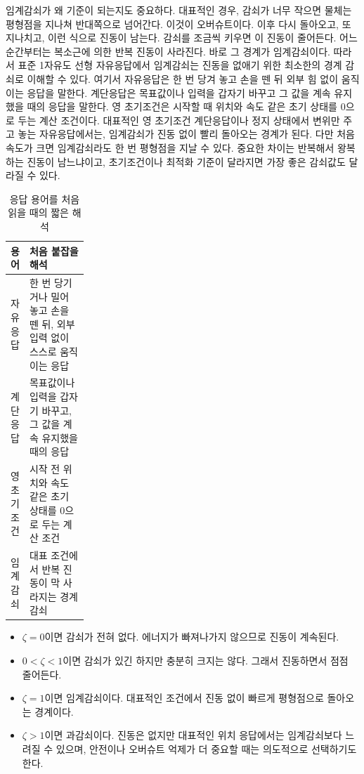 임계감쇠가 왜 기준이 되는지도 중요하다.
대표적인 경우, 감쇠가 너무 작으면 물체는 평형점을 지나쳐 반대쪽으로 넘어간다.
이것이 오버슈트이다.
이후 다시 돌아오고, 또 지나치고, 이런 식으로 진동이 남는다.
감쇠를 조금씩 키우면 이 진동이 줄어든다.
어느 순간부터는 복소근에 의한 반복 진동이 사라진다.
바로 그 경계가 임계감쇠이다.
따라서 표준 1자유도 선형 자유응답에서 임계감쇠는 진동을 없애기 위한 최소한의 경계 감쇠로 이해할 수 있다.
여기서 자유응답은 한 번 당겨 놓고 손을 뗀 뒤 외부 힘 없이 움직이는 응답을 말한다.
계단응답은 목표값이나 입력을 갑자기 바꾸고 그 값을 계속 유지했을 때의 응답을 말한다.
영 초기조건은 시작할 때 위치와 속도 같은 초기 상태를 0으로 두는 계산 조건이다.
대표적인 영 초기조건 계단응답이나 정지 상태에서 변위만 주고 놓는 자유응답에서는, 임계감쇠가 진동 없이 빨리 돌아오는 경계가 된다.
다만 처음 속도가 크면 임계감쇠라도 한 번 평형점을 지날 수 있다.
중요한 차이는 반복해서 왕복하는 진동이 남느냐이고, 초기조건이나 최적화 기준이 달라지면 가장 좋은 감쇠값도 달라질 수 있다.

\begin{table}[!htbp]
  \centering
  \caption{응답 용어를 처음 읽을 때의 짧은 해석}
  \small
  \setlength{\tabcolsep}{4pt}
  \begin{tabularx}{\linewidth}{@{}>{\raggedright\arraybackslash}p{0.22\linewidth}>{\raggedright\arraybackslash}X@{}}
    \toprule
    용어 & 처음 붙잡을 해석 \\
    \midrule
    자유응답 & 한 번 당기거나 밀어 놓고 손을 뗀 뒤, 외부 입력 없이 스스로 움직이는 응답 \\
    계단응답 & 목표값이나 입력을 갑자기 바꾸고, 그 값을 계속 유지했을 때의 응답 \\
    영 초기조건 & 시작 전 위치와 속도 같은 초기 상태를 0으로 두는 계산 조건 \\
    임계감쇠 & 대표 조건에서 반복 진동이 막 사라지는 경계 감쇠 \\
    \bottomrule
  \end{tabularx}
\end{table}

\begin{itemize}
  \item $\zeta=0$이면 감쇠가 전혀 없다. 에너지가 빠져나가지 않으므로 진동이 계속된다.
  \item $0<\zeta<1$이면 감쇠가 있긴 하지만 충분히 크지는 않다. 그래서 진동하면서 점점 줄어든다.
  \item $\zeta=1$이면 임계감쇠이다. 대표적인 조건에서 진동 없이 빠르게 평형점으로 돌아오는 경계이다.
  \item $\zeta>1$이면 과감쇠이다. 진동은 없지만 대표적인 위치 응답에서는 임계감쇠보다 느려질 수 있으며, 안전이나 오버슈트 억제가 더 중요할 때는 의도적으로 선택하기도 한다.
\end{itemize}

